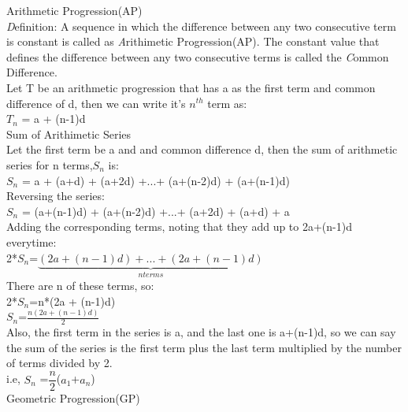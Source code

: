 \documentclass{article}
\begin{document}
 {\Large Arithmetic Progression(AP)}
 \vspace{2mm}
 \\
 {\emph Definition:} \hspace{2mm}A sequence in which the difference between any two consecutive term is constant is called as {\emph Arithimetic Progression(AP)}.
 The constant value that defines the difference between any two consecutive terms is called the {\emph Common Difference}.
 \\ Let T be an arithmetic progression that has a as the first term and common difference of d, then we can write it's $n^{th}$ term as:
 \\\vspace{1mm}$T_{n}$ = a + (n-1)d
\vspace{4mm} \\ 
 {\large Sum of Arithimetic Series}
 \vspace{2mm}
\\Let the first term be a and and common difference d, then the sum of arithmetic series for n terms,$S_{n}$ is:
\\\vspace{1mm}$S_{n}$ = a + (a+d) + (a+2d) +...+ (a+(n-2)d) + (a+(n-1)d) 
\\Reversing the series:
\\\vspace{1mm}$S_{n}$ = (a+(n-1)d) + (a+(n-2)d) +...+ (a+2d) + (a+d) + a
\\Adding the corresponding terms, noting that they add up to 2a+(n-1)d everytime:
\\\vspace{1mm}2*$S_{n}$=$\underbrace{(2a+(n-1)d) + ... + (2a+(n-1)d)}_{n terms}$
\\There are n of these terms, so:
\\ \vspace{2mm} 2*$S_{n}$=n*(2a + (n-1)d)
\\ \vspace{2mm} $S_{n}$=$\frac{n(2a + (n-1)d)}{2}$
\\Also, the first term in the series is a, and the last one is a+(n-1)d,
so we can say the sum of the series is the first term plus the last term multiplied by the number of terms divided by 2.
\\\vspace{1mm}i.e, $S_{n}$ =$\dfrac{n}{2}$($a_{1}$+$a_{n}$)
\vspace{5mm}
\\
{\Large Geometric Progression(GP)}
 \vspace{2mm}
\end{document}
